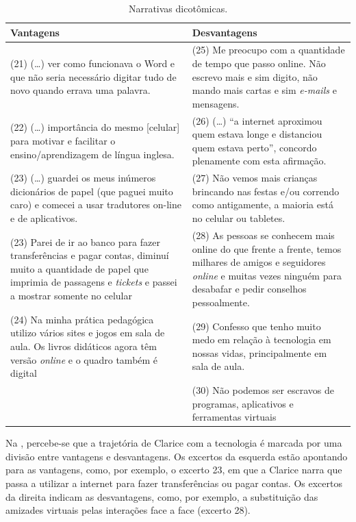\documentclass{textolivre}
\begin{document}
\begin{table}[htpb]
\caption{Narrativas dicotômicas.}
\label{tbl-tabela-02}
\begin{tabular}{p{}p{}}
\toprule
\textbf{Vantagens} & \textbf{Desvantagens} \\
\midrule
(21) (\ldots) ver como funcionava o Word e que não seria necessário digitar tudo de novo quando errava uma palavra. &
(25) Me preocupo com a quantidade de tempo que passo online. Não escrevo mais e sim digito, não mando mais cartas e sim \textit{e-mails} e mensagens. \\
(22) (\ldots) importância do mesmo {[}celular{]} para motivar e facilitar o ensino/aprendizagem de língua inglesa. &
(26) (\ldots) “a internet aproximou quem estava longe e distanciou quem estava perto”, concordo plenamente com esta afirmação. \\
(23) (\ldots) guardei os meus inúmeros dicionários de papel (que paguei muito caro) e comecei a usar tradutores on-line e de aplicativos. &
(27) Não vemos mais crianças brincando nas festas e/ou correndo como antigamente, a maioria está no celular ou tabletes. \\
(23) Parei de ir ao banco para fazer transferências e pagar contas, diminuí muito a quantidade de papel que imprimia de passagens e \textit{tickets} e passei a mostrar somente no celular &
(28) As pessoas se conhecem mais online do que frente a frente, temos milhares de amigos e seguidores \textit{online} e muitas vezes ninguém para desabafar e pedir conselhos pessoalmente. \\
(24) Na minha prática pedagógica utilizo vários sites e jogos em sala de aula. Os livros didáticos agora têm versão \textit{online} e o quadro também é digital &
(29) Confesso que tenho muito medo em relação à tecnologia em nossas vidas, principalmente em sala de aula. \\
 &
(30) Não podemos ser escravos de programas, aplicativos e ferramentas virtuais \\
\bottomrule
\end{tabular}
\end{table}

Na , percebe-se que a trajetória de Clarice com a tecnologia é marcada por uma divisão entre vantagens e desvantagens. Os excertos da esquerda estão apontando para as vantagens, como, por exemplo, o excerto 23, em que a Clarice narra que passa a utilizar a internet para fazer transferências ou pagar contas. Os excertos da direita indicam as desvantagens, como, por exemplo, a substituição das amizades virtuais pelas interações face a face (excerto 28). 
\end{document}
